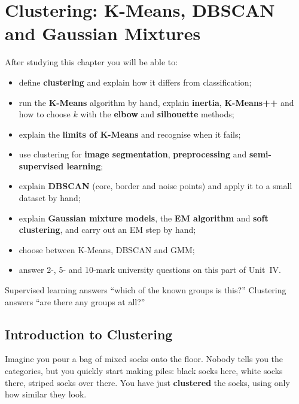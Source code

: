 \chapter{Clustering: K-Means, DBSCAN and Gaussian Mixtures}
\label{ch:cluster}



\begin{objectives}
After studying this chapter you will be able to:
\begin{itemize}
  \item define \textbf{clustering} and explain how it differs from classification;
  \item run the \textbf{K-Means} algorithm by hand, explain \textbf{inertia}, \textbf{K-Means++} and how to choose $k$ with the \textbf{elbow} and \textbf{silhouette} methods;
  \item explain the \textbf{limits of K-Means} and recognise when it fails;
  \item use clustering for \textbf{image segmentation}, \textbf{preprocessing} and \textbf{semi-supervised learning};
  \item explain \textbf{DBSCAN} (core, border and noise points) and apply it to a small dataset by hand;
  \item explain \textbf{Gaussian mixture models}, the \textbf{EM algorithm} and \textbf{soft clustering}, and carry out an EM step by hand;
  \item choose between K-Means, DBSCAN and GMM;
  \item answer 2-, 5- and 10-mark university questions on this part of Unit~IV.
\end{itemize}
\end{objectives}

\begin{pullquote}
Supervised learning answers ``which of the known groups is this?'' Clustering answers ``are there any groups at all?''
\end{pullquote}

\section{Introduction to Clustering}

Imagine you pour a bag of mixed socks onto the floor. Nobody tells you the categories, but you quickly start making piles: black socks here, white socks there, striped socks over there. You have just \textbf{clustered} the socks, using only how similar they look.


